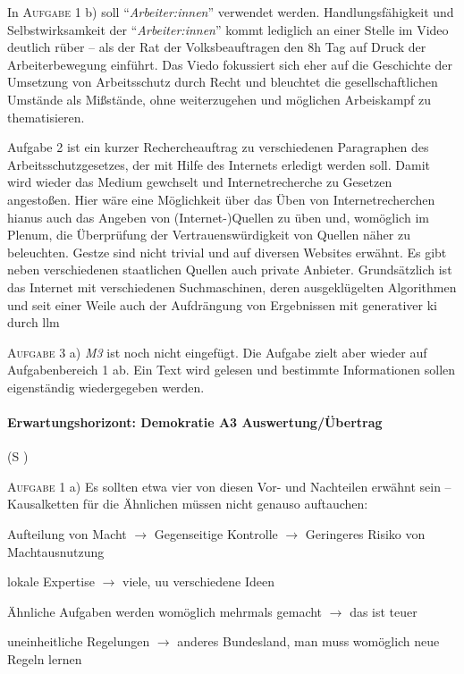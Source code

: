 In \textsc{Aufgabe 1} b) soll \enquote{\emph{Arbeiter:innen}} verwendet werden. Handlungsfähigkeit und Selbstwirksamkeit der \enquote{\emph{Arbeiter:innen}} kommt lediglich an einer Stelle im Video deutlich rüber -- als der Rat der Volksbeauftragen den 8h Tag auf Druck der Arbeiterbewegung einführt. Das Viedo fokussiert sich eher auf die Geschichte der Umsetzung von Arbeitsschutz durch Recht und bleuchtet die gesellschaftlichen Umstände als Mißstände, ohne weiterzugehen und möglichen Arbeiskampf zu thematisieren. %

Aufgabe 2 ist ein kurzer Rechercheauftrag zu verschiedenen Paragraphen des Arbeitsschutzgesetzes, der mit Hilfe des Internets erledigt werden soll. Damit wird wieder das Medium gewchselt und Internetrecherche zu Gesetzen angestoßen. 
Hier wäre eine Möglichkeit über das Üben von Internetrecherchen hianus auch das Angeben von (Internet-)Quellen zu üben und, womöglich im Plenum, die Überprüfung der Vertrauenswürdigkeit von Quellen näher zu beleuchten. Gestze sind nicht trivial und auf diversen Websites erwähnt. Es gibt neben verschiedenen staatlichen Quellen auch private Anbieter. Grundsätzlich ist das Internet mit verschiedenen Suchmaschinen, deren ausgeklügelten Algorithmen und seit einer Weile auch der Aufdrängung von Ergebnissen mit generativer \gls{ki} durch \gls{llm} 


\textsc{Aufgabe 3} a) \emph{M3} ist noch nicht eingefügt. Die Aufgabe zielt aber wieder auf Aufgabenbereich 1 ab. Ein Text wird gelesen und bestimmte Informationen sollen eigenständig wiedergegeben werden. 



\paragraph{Erwartungshorizont: Demokratie A3 Auswertung/Übertrag} (\gls{S} \pageref{DEMOKRATIE-A3})

\textsc{Aufgabe 1} a) \quad
Es sollten etwa vier von diesen Vor- und Nachteilen erwähnt sein -- Kausalketten für die Ähnlichen müssen nicht genauso auftauchen:
 \begin{myitemize}
    \item Aufteilung von Macht $\rightarrow$ Gegenseitige Kontrolle $\rightarrow$ Geringeres Risiko von Machtausnutzung
    \item lokale Expertise $\rightarrow$ viele, \gls{uu} verschiedene Ideen
    \item Ähnliche Aufgaben werden womöglich mehrmals gemacht $\rightarrow$ das ist teuer
    \item uneinheitliche Regelungen $\rightarrow$ anderes Bundesland, man muss womöglich neue Regeln lernen
 \end{myitemize}

